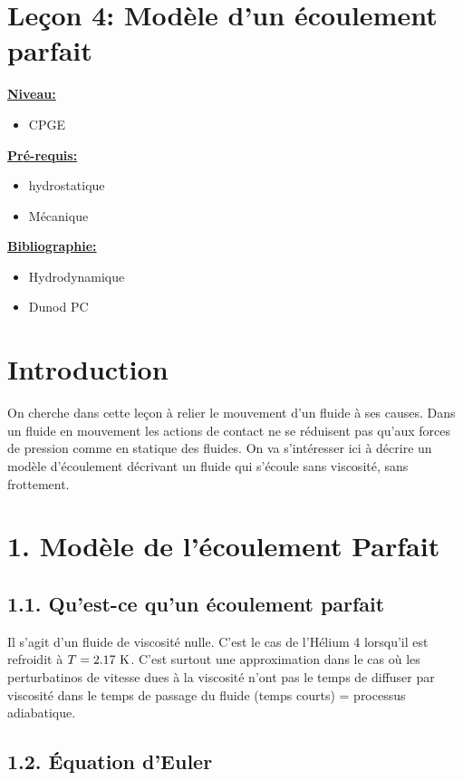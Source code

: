 \documentclass[french, a4paper, 10pt, twocolumn, landscape]{article}
\begin{document}
\section*{Leçon 4: Modèle d'un écoulement parfait}

\noindent\underline{\textbf{Niveau:}}
\begin{itemize}
  \item CPGE 
\end{itemize}
\underline{\textbf{Pr{\'e}-requis: }}

\begin{itemize}  
  \item hydrostatique
  \item Mécanique
\end{itemize}
\underline{\textbf{Bibliographie:}}

\begin{itemize}
  \item Hydrodynamique 
  \item Dunod PC
\end{itemize}


\section*{Introduction}

On cherche dans cette leçon à relier le mouvement d'un fluide à ses causes. Dans un fluide en mouvement les actions de contact ne se réduisent pas qu'aux forces de pression comme en statique des fluides. On va s'intéresser ici à décrire un modèle d'écoulement décrivant un fluide qui s'écoule sans viscosité, sans frottement.

\section*{1. Modèle de l'écoulement Parfait}

\subsection*{1.1. Qu'est-ce qu'un écoulement parfait}

Il s'agit d'un fluide de viscosité nulle. C'est le cas de l'Hélium 4 lorsqu'il est refroidit à $T=2.17~\rm K$. C'est surtout une approximation dans le cas où les perturbatinos de vitesse dues à la viscosité n'ont pas le temps de diffuser par viscosité dans le temps de passage du fluide (temps courts) = processus adiabatique.  

\subsection*{1.2. Équation d'Euler}
\end{document}
